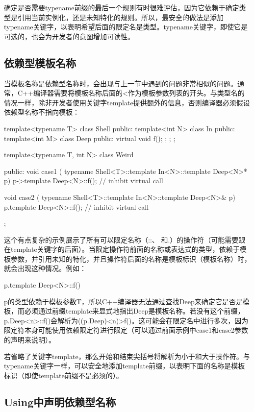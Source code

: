 确定是否需要typename前缀的最后一个规则有时很难评估，因为它依赖于确定类型是引用当前实例化，还是未知特化的规则。所以，最安全的做法是添加typename关键字，以表明希望后面的限定名是类型。typename关键字，即使它是可选的，也会为开发者的意图增加可读性。

\subsection{依赖型模板名称}

当模板名称是依赖型名称时，会出现与上一节中遇到的问题非常相似的问题。通常，C++编译器需要将模板名称后面的<作为模板参数列表的开头。与类型名的情况一样，除非开发者使用关键字template提供额外的信息，否则编译器必须假设依赖型名称不指向模板：

\begin{cpp}
template<typename T>
class Shell {
	public:
	template<int N>
	class In {
		public:
		template<int M>
		class Deep {
			public:
			virtual void f();
		};
	};
};

template<typename T, int N>
class Weird {
public:
	void case1 (
	typename Shell<T>::template In<N>::template Deep<N>* p) {
		p->template Deep<N>::f(); // inhibit virtual call
	}

	void case2 (
	typename Shell<T>::template In<N>::template Deep<N>& p) {
		p.template Deep<N>::f(); // inhibit virtual call
	}
};
\end{cpp}

这个有点复杂的示例展示了所有可以限定名称（::、\inlcpp{->} 和.）的操作符（可能需要跟在template关键字的后面）。当限定操作符前面的名称或表达式的类型，依赖于模板参数，并引用未知的特化，并且操作符后面的名称是模板标识（模板名称）时，就会出现这种情况。例如：

\begin{cpp}
p.template Deep<N>::f()
\end{cpp}

p的类型依赖于模板参数T，所以C++编译器无法通过查找Deep来确定它是否是模板，而必须通过前缀template来显式地指出Deep是模板名称。若没有这个前缀，p.Deep<n>::f()会解析为((p.Deep)<n)>f()。这可能会在限定名中进行多次，因为限定符本身可能使用依赖限定符进行限定（可以通过前面示例中case1和case2参数的声明来说明）。

若省略了关键字template，那么开始和结束尖括号将解析为小于和大于操作符。与typename关键字一样，可以安全地添加template前缀，以表明下面的名称是模板标识（即使template前缀不是必须的）。

\subsection{Using中声明依赖型名称}

